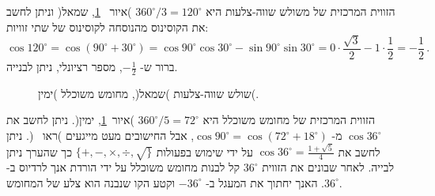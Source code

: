 \documentclass[11pt,a4paper]{article}
\newcommand*{\disfrac}[2]{\displaystyle\frac{#1}{#2}}
\newcommand*{\sm}[1]{$\scriptstyle #1$}
\begin{document}
הזווית המרכזית של משולש שווה-צלעות היא
$360^\circ/3=120^\circ$ )איור ~\ref{fig.triangle-pentagon},
שמאל(
וניתן לחשב את הקוסינוס מהנוסחה לקוסינוס של שתי זוויות:
\[
\cos 120^\circ = \cos(90^\circ+30^\circ)=\cos 90^\circ \cos 30^\circ  -\sin 90^\circ \sin 30^\circ = 0\cdot \frac{\sqrt{3}}{2} - 1\cdot \frac{1}{2}=-\disfrac{1}{2}\,.
\]
ברור ש-%
$-\frac{1}{2}$,
מספר רציונלי,
ניתן לבנייה.
\begin{figure}[htb]
\begin{center}
\caption{%
שולש שווה-צלעות )שמאל(, מחומש משוכלל )ימין(.}%
\label{fig.triangle-pentagon}
\end{center}
\end{figure}
הזווית המרכזית של מחומש משוכלל היא
$360^\circ/5=72^\circ$ )איור~\ref{fig.triangle-pentagon},
ימין(.
ניתן לחשב את
$\cos 36^\circ$
מ-%
$\cos 90^\circ = \cos(72^\circ+ 18^\circ)$,
אבל החישובים מעט מייגעים
)ראו
~\cite{wiki:pentagon}(.
ניתן לחשב את
$\cos 36^\circ=\disfrac{1+\sqrt{5}}{4}$
על ידי שימוש בפעולות
$\{+,-,\times,\div,\surd\}$
כך שהערך ניתן לבייה.
לאחר שבונים את הזווית
$36^\circ$
קל לבנות מחומש משוכלל על ידי הורדת אנך לרדיוס ב-%
$36^\circ$.
האנך יחתוך את המעגל ב-%
$-36^\circ$
וקטע הקו שנבנה הוא צלע של המחומש.
\end{document}
